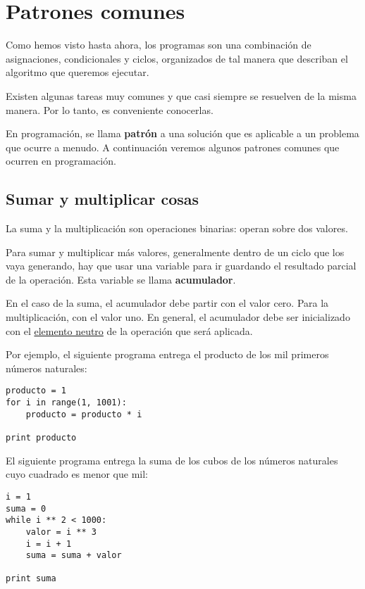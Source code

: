 \chapter{Patrones comunes}

Como hemos visto hasta ahora, los programas son una combinación de
asignaciones, condicionales y ciclos, organizados de tal manera que
describan el algoritmo que queremos ejecutar.

Existen algunas tareas muy comunes y que casi siempre se resuelven de la
misma manera. Por lo tanto, es conveniente conocerlas.

En programación, se llama \textbf{patrón} a una solución que es
aplicable a un problema que ocurre a menudo. A continuación veremos
algunos patrones comunes que ocurren en programación.

\section{Sumar y multiplicar cosas}

La suma y la multiplicación son operaciones binarias: operan sobre dos
valores.

Para sumar y multiplicar más valores, generalmente dentro de un ciclo
que los vaya generando, hay que usar una variable para ir guardando el
resultado parcial de la operación. Esta variable se llama
\textbf{acumulador}.

En el caso de la suma, el acumulador debe partir con el valor cero. Para
la multiplicación, con el valor uno. En general, el acumulador debe ser
inicializado con el
\href{http://es.wikipedia.org/wiki/Elemento\_neutro}{elemento neutro} de
la operación que será aplicada.

Por ejemplo, el siguiente programa entrega el producto de los mil
primeros números naturales:

\begin{lstlisting}
producto = 1
for i in range(1, 1001):
    producto = producto * i

print producto
\end{lstlisting}

El siguiente programa entrega la suma de los cubos de los números
naturales cuyo cuadrado es menor que mil:

\begin{lstlisting}
i = 1
suma = 0
while i ** 2 < 1000:
    valor = i ** 3
    i = i + 1
    suma = suma + valor

print suma
\end{lstlisting}

